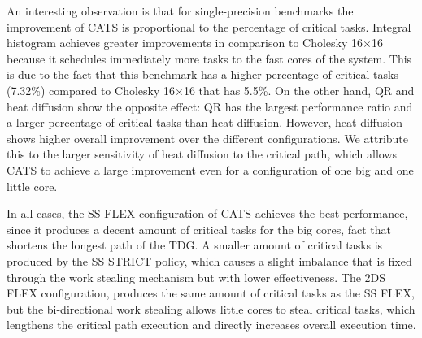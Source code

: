 An interesting observation is that for single-precision benchmarks the improvement of CATS is proportional to the percentage of critical tasks. 
Integral histogram achieves greater improvements in comparison to Cholesky 16$\times$16 because it schedules immediately more tasks to the fast cores of the system.
This is due to the fact that this benchmark has a higher percentage of critical tasks (7.32\%) compared to Cholesky 16$\times$16 that has 5.5\%. 
On the other hand, QR and heat diffusion show the opposite effect: QR has the largest performance ratio and a larger percentage of critical tasks than heat diffusion. 
However, heat diffusion shows higher overall improvement over the different configurations. 
We attribute this to the larger sensitivity of heat diffusion to the critical path, which allows CATS to achieve a large improvement even for a configuration of one big and one little core. 

In all cases, the SS FLEX configuration of CATS achieves the best performance, since it produces a decent amount of critical tasks for the big cores, fact that shortens the longest path of the TDG. 
A smaller amount of critical tasks is produced by the SS STRICT policy, which causes a slight imbalance that is fixed through the work stealing mechanism but with lower effectiveness. 
The 2DS FLEX configuration, produces the same amount of critical tasks as the SS FLEX, but the bi-directional work stealing allows little cores to steal critical tasks, which lengthens the critical path execution and directly increases overall execution time.

